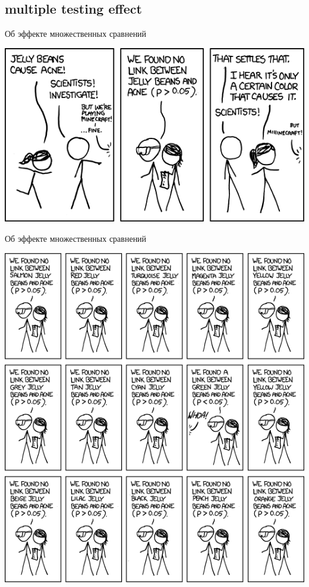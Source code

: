 \subsection{multiple testing effect}
\begin{frame}{Об эффекте множественных сравнений}
\vfill
\begin{center}
\includegraphics[width=0.8\linewidth]{jellybeanexample1.png}
\end{center}
\end{frame}
\begin{frame}{Об эффекте множественных сравнений}
\vfill
\begin{center}
\includegraphics[width=0.65\linewidth]{jellybeanexample2.png}
\end{center}
\end{frame}
